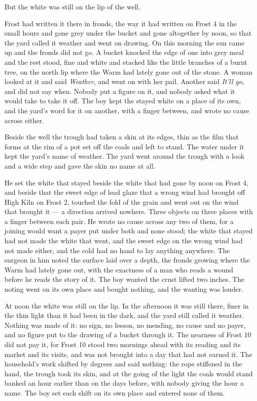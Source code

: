 But the white was still on the lip of the well.

Frost had written it there in fronds, the way it had written on Frost 4 in the small hours and gone grey under the bucket and gone altogether by noon, so that the yard called it weather and went on drawing. On this morning the sun came up and the fronds did not go. A bucket knocked the edge of one into grey meal and the rest stood, fine and white and stacked like the little branches of a burnt tree, on the north lip where the Warm had lately gone out of the stone. A woman looked at it and said \emph{Weather}, and went on with her pail. Another said \emph{It'll go}, and did not say when. Nobody put a figure on it, and nobody asked what it would take to take it off. The boy kept the stayed white on a place of its own, and the yard's word for it on another, with a finger between, and wrote no cause across either.

Beside the well the trough had taken a skin at its edges, thin as the film that forms at the rim of a pot set off the coals and left to stand. The water under it kept the yard's name of weather. The yard went around the trough with a look and a wide step and gave the skin no name at all.

He set the white that stayed beside the white that had gone by noon on Frost 4, and beside that the sweet edge of lead glaze that a wrong wind had brought off High Kiln on Frost 2, touched the fold of the grain and went out on the wind that brought it --- a direction arrived nowhere. Three objects on three places with a finger between each pair. He wrote no cause across any two of them, for a joining would want a payer put under both and none stood; the white that stayed had not made the white that went, and the sweet edge on the wrong wind had not made either, and the cold had no hand to lay anything anywhere. The surgeon in him noted the surface laid over a depth, the fronds growing where the Warm had lately gone out, with the exactness of a man who reads a wound before he reads the story of it. The boy wanted the crust lifted two inches. The noting went on its own place and bought nothing, and the wanting was louder.

\scenebreak

At noon the white was still on the lip. In the afternoon it was still there, finer in the thin light than it had been in the dark, and the yard still called it weather. Nothing was made of it: no sign, no lesson, no mending, no cause and no payer, and no figure put to the drawing of a bucket through it. The nearness of Frost 10 did not pay it, for Frost 10 stood two mornings ahead with its reading and its market and its visits, and was not brought into a day that had not earned it. The household's work shifted by degrees and said nothing: the rope stiffened in the hand, the trough took its skin, and at the going of the light the coals would stand banked an hour earlier than on the days before, with nobody giving the hour a name. The boy set each shift on its own place and entered none of them.

